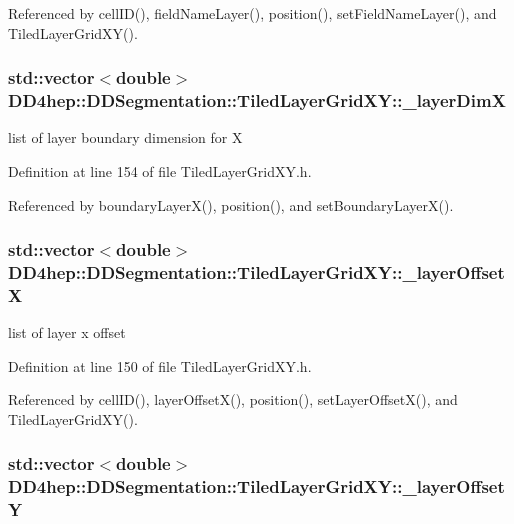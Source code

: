Referenced by cellID(), fieldNameLayer(), position(), setFieldNameLayer(), and TiledLayerGridXY().\hypertarget{class_d_d4hep_1_1_d_d_segmentation_1_1_tiled_layer_grid_x_y_a6ce81c79c43efdb092b454a1047fd666}{
\subsubsection[{\_\-layerDimX}]{\setlength{\rightskip}{0pt plus 5cm}std::vector$<$double$>$ {\bf DD4hep::DDSegmentation::TiledLayerGridXY::\_\-layerDimX}}}
\label{class_d_d4hep_1_1_d_d_segmentation_1_1_tiled_layer_grid_x_y_a6ce81c79c43efdb092b454a1047fd666}


list of layer boundary dimension for X 

Definition at line 154 of file TiledLayerGridXY.h.

Referenced by boundaryLayerX(), position(), and setBoundaryLayerX().\hypertarget{class_d_d4hep_1_1_d_d_segmentation_1_1_tiled_layer_grid_x_y_a6974df570df9c6cd533b17a78f3cb0d3}{
\subsubsection[{\_\-layerOffsetX}]{\setlength{\rightskip}{0pt plus 5cm}std::vector$<$double$>$ {\bf DD4hep::DDSegmentation::TiledLayerGridXY::\_\-layerOffsetX}}}
\label{class_d_d4hep_1_1_d_d_segmentation_1_1_tiled_layer_grid_x_y_a6974df570df9c6cd533b17a78f3cb0d3}


list of layer x offset 

Definition at line 150 of file TiledLayerGridXY.h.

Referenced by cellID(), layerOffsetX(), position(), setLayerOffsetX(), and TiledLayerGridXY().\hypertarget{class_d_d4hep_1_1_d_d_segmentation_1_1_tiled_layer_grid_x_y_a0ee4e15bd3807f5ecccc82ffb7962377}{
\subsubsection[{\_\-layerOffsetY}]{\setlength{\rightskip}{0pt plus 5cm}std::vector$<$double$>$ {\bf DD4hep::DDSegmentation::TiledLayerGridXY::\_\-layerOffsetY}}}
\label{class_d_d4hep_1_1_d_d_segmentation_1_1_tiled_layer_grid_x_y_a0ee4e15bd3807f5ecccc82ffb7962377}


